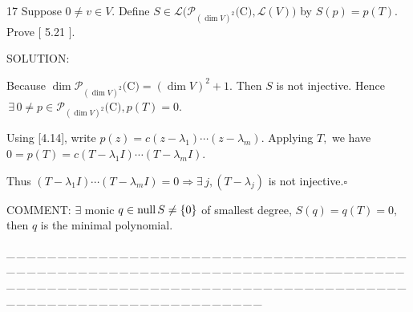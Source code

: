 \documentclass[a4paper, 11pt, UTF8]{article}
\def\null{\textup{null\,}}
\def\Lm{\mathcal{L}}
\def\Po{\mathcal{P}}
\begin{document}
\begin{large}
{\timesbf\Large 17} {\timessl\Large 
Suppose $0\neq v\in V.$ Define $S\in\Lm(\Po_{(\dim V)^2}(${\timesbf C}$),\Lm(V))$ by $S(p)=p(T).$ Prove $[$ 5.21 $].$
}\par
{\timesbf S\footnotesize{OLUTION:}}\par\quad
Because $\dim\Po_{(\dim V)^2}(${\timesbf C}$)=(\dim V)^2+1.$ Then $S$ is not injective. Hence $\,\exists\,0\neq p\in\Po_{(\dim V)^2}(${\timesbf C}$),p(T)=0.$\par\quad
Using [4.14], write $p(z)=c(z-\lambda_1)\cdots(z-\lambda_m).$ Applying $T,$ we have $0=p(T)=c(T-\lambda_1 I)\cdots(T-\lambda_m I).$\par\quad
Thus $(T-\lambda_1 I)\cdots(T-\lambda_m I)=0\Rightarrow\exists\,j,(T-\lambda_j)$ is not injective.\quad$\square$\par\quad
C{\small OMMENT:} $\exists$ monic $q\in\null S\neq \{0\}$ of smallest degree, $S(q)=q(T)=0,$ then $q$ is the {\timessl minimal polynomial.}\par
{\tiny \_\,\_\,\_\,\_\,\_\,\_\,\_\,\_\,\_\,\_\,\_\,\_\,\_\,\_\,\_\,\_\,\_\,\_\,\_\,\_\,\_\,\_\,\_\,\_\,\_\,\_\,\_\,\_\,\_\,\_\,\_\,\_\,\_\,\_\,\_\,\_\,\_\,\_\,\_\,\_\,\_\,\_\,\_\,\_\,\_\,\_\,\_\,\_\,\_\,\_\,\_\,\_\,\_\,\_\,\_\,\_\,\_\,\_\,\_\,\_\,\_\,\_\,\_\,\_\,\_\,\_\,\_\,\_\,\_\,\_\,\_\_\,\_\,\_\,\_\,\_\,\_\,\_\,\_\,\_\,\_\,\_\,\_\,\_\,\_\,\_\,\_\,\_\,\_\,\_\,\_\,\_\,\_\,\_\,\_\,\_\,\_\,\_\,\_\,\_\,\_\,\_\,\_\,\_\,\_\,\_\,\_\,\_\,\_\,\_\,\_\,\_\,\_\,\_\,\_\,\_\,\_\,\_\,\_\,\_\,\_\,\_\,\_\,\_\,\_\,\_\,\_\,\_\,\_\,\_\,\_\,\_\,\_\,\_\,\_\,\_\,\_\,\_\,\_\,\_\,\_\,\_}\par


\end{large}
\end{document}

